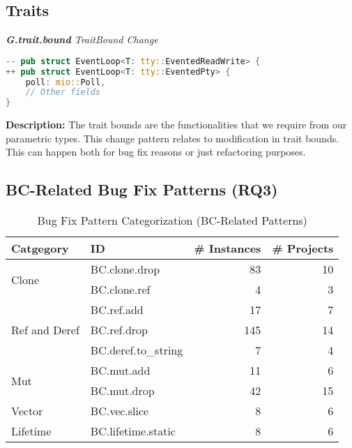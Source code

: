 \subsection{Traits}
\noindent \textit{ \textbf{G.trait.bound} TraitBound Change}

\begin{lstlisting}[language=Rust, style=colouredRust]
-- pub struct EventLoop<T: tty::EventedReadWrite> {
++ pub struct EventLoop<T: tty::EventedPty> {
    poll: mio::Poll,
    // Other fields
}

\end{lstlisting}

\noindent \textbf{Description:} The trait bounds are the functionalities that we require from our parametric types. This change pattern relates to modification in trait bounds. This can happen both for bug fix reasons or just refactoring purposes.

\subsection{\label{sec:bc_patterns}BC-Related Bug Fix Patterns (RQ3)}

\begin{table}[]
\begin{tabular}{l|l|r|r}
\textbf{Catgegory} & \textbf{ID} & \textbf{\# Instances} & \textbf{\# Projects} \\
\hline
\multirow{2}{*}{Clone}                                         & BC.clone.drop & 83 & 10 \\
& BC.clone.ref & 4 & 3   
\\\cline{1-4}
\multirow{3}{*}{Ref and Deref} & BC.ref.add & 17 & 7 \\
& BC.ref.drop & 145 & 14 \\
& BC.deref.to\_string  & 7 & 4                                            \\\cline{1-4}
\multirow{2}{*}{Mut} & BC.mut.add  & 11 & 6 \\
& BC.mut.drop  & 42 & 15                               \\\cline{1-4}
Vector & BC.vec.slice  & 8 & 6                                    \\\cline{1-4}
\multirow{1}{*}{Lifetime}      
& BC.lifetime.static  & 8 & 6
\\
\end{tabular}
\caption{\label{table:bc}Bug Fix Pattern Categorization (BC-Related Patterns)}
\end{table}
    

